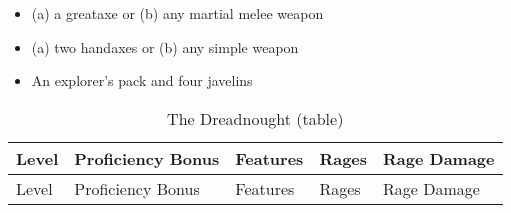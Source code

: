 \begin{itemize}
\item
  (a) a greataxe or (b) any martial melee weapon
\item
  (a) two handaxes or (b) any simple weapon
\item
  An explorer's pack and four javelins
\end{itemize}

\begin{longtable}[]{@{}
  >{\raggedright\arraybackslash}p{}
  >{\raggedright\arraybackslash}p{}
  >{\raggedright\arraybackslash}p{}
  >{\raggedright\arraybackslash}p{}
  >{\raggedright\arraybackslash}p{}@{}}
\caption{The Dreadnought
(table)}\label{dreadnought-table}\tabularnewline
\toprule\noalign{}
\begin{minipage}[b]{\linewidth}\raggedright
Level
\end{minipage} & \begin{minipage}[b]{\linewidth}\raggedright
Proficiency Bonus
\end{minipage} & \begin{minipage}[b]{\linewidth}\raggedright
Features
\end{minipage} & \begin{minipage}[b]{\linewidth}\centering
Rages
\end{minipage} & \begin{minipage}[b]{\linewidth}\raggedright
Rage Damage
\end{minipage} \\
\midrule\noalign{}
\endfirsthead
\toprule\noalign{}
\begin{minipage}[b]{\linewidth}\raggedright
Level
\end{minipage} & \begin{minipage}[b]{\linewidth}\raggedright
Proficiency Bonus
\end{minipage} & \begin{minipage}[b]{\linewidth}\raggedright
Features
\end{minipage} & \begin{minipage}[b]{\linewidth}\centering
Rages
\end{minipage} & \begin{minipage}[b]{\linewidth}\raggedright
Rage Damage
\end{minipage} \\

\end{longtable}
